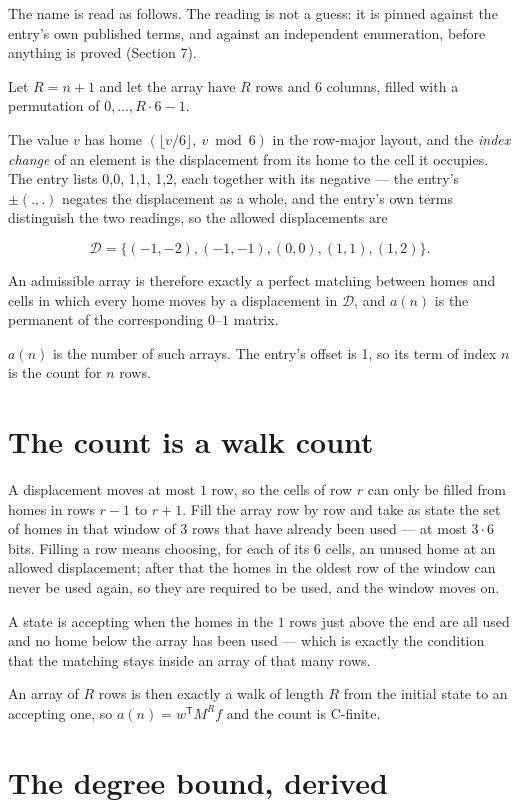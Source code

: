 \documentclass[11pt]{article}
\theoremstyle{definition}
\begin{document}
The name is read as follows. The reading is not a guess: it is pinned against the entry's own published terms, and against an independent enumeration, before anything is proved (Section 7).

Let $R = n + 1$ and let the array have $R$ rows and $6$ columns, filled with a permutation of $0,\dots,R\cdot6-1$.

The value $v$ has home $(\lfloor v/6\rfloor,\ v \bmod 6)$ in the row-major layout, and the {\itshape index change} of an element is the displacement from its home to the cell it occupies. The entry lists 0,0, 1,1, 1,2, each together with its negative --- the entry's $\pm(.,.)$ negates the displacement as a whole, and the entry's own terms distinguish the two readings, so the allowed displacements are

\[\mathcal{D} = \{(-1,-2), (-1,-1), (0,0), (1,1), (1,2)\}.\]

An admissible array is therefore exactly a perfect matching between homes and cells in which every home moves by a displacement in $\mathcal{D}$, and $a(n)$ is the permanent of the corresponding $0$--$1$ matrix.

$a(n)$ is the number of such arrays. The entry's offset is 1, so its term of index $n$ is the count for $n$ rows.

\section{The count is a walk count}

A displacement moves at most $1$ row, so the cells of row $r$ can only be filled from homes in rows $r-1$ to $r+1$. Fill the array row by row and take as state the set of homes in that window of $3$ rows that have already been used --- at most $3\cdot6$ bits. Filling a row means choosing, for each of its $6$ cells, an unused home at an allowed displacement; after that the homes in the oldest row of the window can never be used again, so they are required to be used, and the window moves on.

A state is accepting when the homes in the $1$ rows just above the end are all used and no home below the array has been used --- which is exactly the condition that the matching stays inside an array of that many rows.

An array of $R$ rows is then exactly a walk of length $R$ from the initial state to an accepting one, so $a(n) = w^{\mathsf T}M^{R}f$ and the count is C-finite.

\section{The degree bound, derived}
\end{document}
